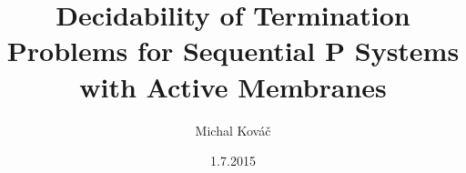\usepackage[utf8]{inputenc}
\usepackage{slovak}
\usepackage{tikz}
\usetikzlibrary{arrows,positioning}

\title{Decidability of Termination Problems for Sequential P Systems with Active Membranes}
\author{Michal Kováč}
\date{1.7.2015}


\newcommand{\simulationpicture}{
  \tikzstyle{mybox} = [draw=black,very thick, rectangle, rounded corners, inner sep=10pt]
  \begin{tikzpicture}
    \onslide<2->{
      \node [mybox] (box){%
        \begin{minipage}{0.40\textwidth}
          \vspace{0pt}
          \begin{align}
            \tag{$r_1$}a\ |\ a &\rightarrow a\ |\ b\\
            \tag{$r_2$}a\ |\ b\ |\ b&\rightarrow b\\
            \tag{$r_3$}b &\rightarrow c
          \end{align}
          $a\ |\ a\ |\ b$
        \end{minipage}
      };
    }
    \onslide<3-4>{
      \node [mybox,below=3cm of box.west,anchor=west] (box2) {$a\ |\ b\ |\ c$};
      \path[-triangle 45] (box) edge [left] node {$r_1, r_3$} (box2);
    }
    \onslide<4-4>{
      \node [mybox,below=3cm of box.east,anchor=east] (box3){$a\ |\ c\ |\ c$};
      \path[-triangle 45] (box2) edge [above] node {$r_3$} (box3);
    }
    \onslide<6->{
      \node [mybox,below=3cm of box.east,anchor=east] (box2) {$a\ |\ b\ |\ b$};
      \path[-triangle 45] (box) edge [left] node {$r_1$} (box2);
    }
    \onslide<7->{
      \node [mybox,right=5cm of box.north,anchor=north] (box3){$a\ |\ a\ |\ c$};
      \path[-triangle 45] (box) edge [above] node {$r_3$} (box3);
    }
    \onslide<8->{
      \node [mybox,below=2cm of box3.west,anchor=west] (box4){$a\ |\ b\ |\ c$};
      \path[-triangle 45] (box2) edge [above] node {$r_3$} (box4);
      \path[-triangle 45] (box3) edge [left] node {$r_1$} (box4);
    }
    \onslide<9->{
      \node [mybox,below=2cm of box4.west,anchor=west] (box5){$a\ |\ c\ |\ c$};
      \path[-triangle 45] (box4) edge [left] node {$r_3$} (box5);
    }
    \onslide<10->{
      \node [mybox,below=3cm of box.west,anchor=west] (box6){$b$};
      \path[-triangle 45] (box2) edge [above] node {$r_2$} (box6);
    }
  \end{tikzpicture}
}

\begin{frame}[t]
\titlepage
\end{frame}
\note{}


